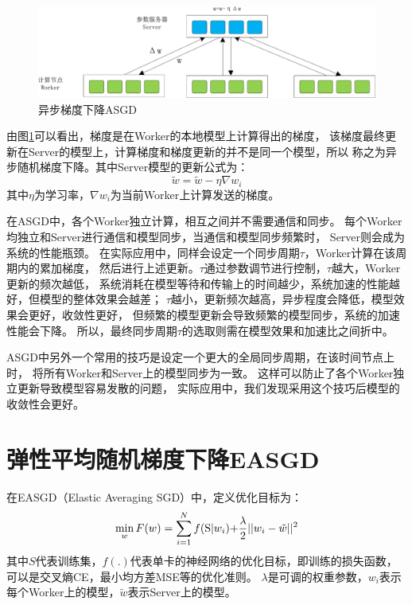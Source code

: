 \begin{figure}[htb]
\centering
\includegraphics[width=1.0\textwidth]{figures/chapter5/asgd-crop}
\caption{异步梯度下降ASGD}
\label{fig:asgd}
\end{figure}

由图\ref{fig:asgd}可以看出，梯度是在Worker的本地模型上计算得出的梯度，
该梯度最终更新在Server的模型上，计算梯度和梯度更新的并不是同一个模型，所以
称之为异步随机梯度下降。其中Server模型的更新公式为：
\begin{equation}
{\tilde w} = {\tilde w} - \eta \nabla w_i
\end{equation}
其中$\eta$为学习率，$\nabla w_i$为当前Worker上计算发送的梯度。


在ASGD中，各个Worker独立计算，相互之间并不需要通信和同步。
每个Worker均独立和Server进行通信和模型同步，当通信和模型同步频繁时，
Server则会成为系统的性能瓶颈。
在实际应用中，同样会设定一个同步周期$\tau$，Worker计算在该周期内的累加梯度，
然后进行上述更新。$\tau$通过参数调节进行控制，$\tau$越大，Worker更新的频次越低，
系统消耗在模型等待和传输上的时间越少，系统加速的性能越好，但模型的整体效果会越差；
$\tau$越小，更新频次越高，异步程度会降低，模型效果会更好，收敛性更好，
但频繁的模型更新会导致频繁的模型同步，系统的加速性能会下降。
所以，最终同步周期$\tau$的选取则需在模型效果和加速比之间折中。

ASGD中另外一个常用的技巧是设定一个更大的全局同步周期，在该时间节点上时，
将所有Worker和Server上的模型同步为一致。
这样可以防止了各个Worker独立更新导致模型容易发散的问题，
实际应用中，我们发现采用这个技巧后模型的收敛性会更好。

\section{弹性平均随机梯度下降EASGD}

在EASGD（Elastic Averaging SGD）中，定义优化目标为：
\begin{equation}
\label{equation:easgd}
\mathop {\min }\limits_w F(w) = \sum\limits_{i = 1}^N {f({\rm{S|}}{w_i})} {\rm{ + }}\frac{\lambda }{2}{\rm{||}}{w_i} - \tilde w|{|^2}
\end{equation}
其中$S$代表训练集，$f(.)$代表单卡的神经网络的优化目标，即训练的损失函数，可以是交叉熵CE，最小均方差MSE等的优化准则。
$\lambda$是可调的权重参数，$w_i$表示每个Worker上的模型，$\tilde w $表示Server上的模型。

